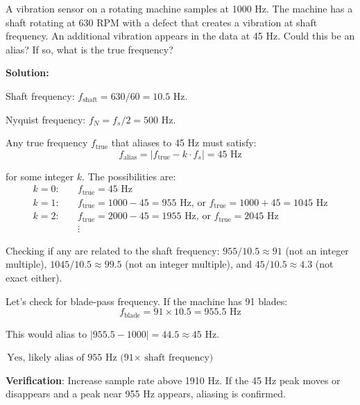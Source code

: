 \begin{example}
\label{ex:alias_identification}
A vibration sensor on a rotating machine samples at 1000 Hz. The machine has a shaft rotating at 630 RPM with a defect that creates a vibration at shaft frequency. An additional vibration appears in the data at 45 Hz. Could this be an alias? If so, what is the true frequency?

\textbf{Solution:}

Shaft frequency: $f_{\text{shaft}} = 630/60 = 10.5$ Hz.

Nyquist frequency: $f_N = f_s/2 = 500$ Hz.

Any true frequency $f_{\text{true}}$ that aliases to 45 Hz must satisfy:
\begin{equation*}
f_{\text{alias}} = |f_{\text{true}} - k \cdot f_s| = 45 \text{ Hz}
\end{equation*}

for some integer $k$. The possibilities are:
\begin{align*}
k = 0: \quad & f_{\text{true}} = 45 \text{ Hz} \\
k = 1: \quad & f_{\text{true}} = 1000 - 45 = 955 \text{ Hz, or } f_{\text{true}} = 1000 + 45 = 1045 \text{ Hz} \\
k = 2: \quad & f_{\text{true}} = 2000 - 45 = 1955 \text{ Hz, or } f_{\text{true}} = 2045 \text{ Hz} \\
& \vdots
\end{align*}

Checking if any are related to the shaft frequency: $955/10.5 \approx 91$ (not an integer multiple), $1045/10.5 \approx 99.5$ (not an integer multiple), and $45/10.5 \approx 4.3$ (not exact either).

Let's check for blade-pass frequency. If the machine has 91 blades:
\begin{equation*}
f_{\text{blade}} = 91 \times 10.5 = 955.5 \text{ Hz}
\end{equation*}

This would alias to $|955.5 - 1000| = 44.5 \approx 45$ Hz.

$\boxed{\text{Yes, likely alias of 955 Hz (91$\times$ shaft frequency)}}$

\textbf{Verification}: Increase sample rate above 1910 Hz. If the 45 Hz peak moves or disappears and a peak near 955 Hz appears, aliasing is confirmed.
\end{example}

